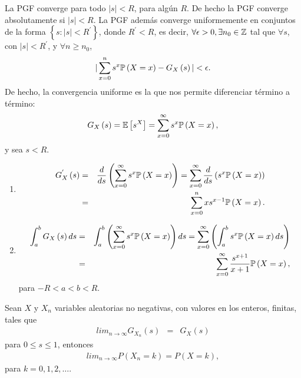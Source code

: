 \begin{Note}
La PGF converge para todo $|s|<R$, para alg\'un $R$. De hecho la
PGF converge absolutamente si $|s|<R$. La PGF adem\'as converge
uniformemente en conjuntos de la forma
$\left\{s:|s|<R^{'}\right\}$, donde $R^{'}<R$, es decir,
$\forall\epsilon>0, \exists n_{0}\in\mathbb{Z}$ tal que $\forall s$, con
$|s|<R^{'}$, y $\forall n\geq n_{0}$,
\begin{eqnarray*}
|\sum_{x=0}^{n}s^{x}\mathbb{P}\left(X=x\right)-G_{X}\left(s\right)|<\epsilon.
\end{eqnarray*}
De hecho, la convergencia uniforme es la que nos permite
diferenciar t\'ermino a t\'ermino:
\begin{eqnarray*}
G_{X}\left(s\right)=\mathbb{E}\left[s^{X}\right]=\sum_{x=0}^{\infty}s^{x}\mathbb{P}\left(X=x\right),
\end{eqnarray*}
y sea $s<R$.
\begin{enumerate}
\item
\begin{eqnarray*}
G_{X}^{'}\left(s\right)&=&\frac{d}{ds}\left(\sum_{x=0}^{\infty}s^{x}\mathbb{P}\left(X=x\right)\right)=\sum_{x=0}^{\infty}\frac{d}{ds}\left(s^{x}\mathbb{P}\left(X=x\right)\right)\\
&=&\sum_{x=0}^{n}xs^{x-1}\mathbb{P}\left(X=x\right).
\end{eqnarray*}

\item\begin{eqnarray*}
\int_{a}^{b}G_{X}\left(s\right)ds&=&\int_{a}^{b}\left(\sum_{x=0}^{\infty}s^{x}\mathbb{P}\left(X=x\right)\right)ds=\sum_{x=0}^{\infty}\left(\int_{a}^{b}s^{x}\mathbb{P}\left(X=x\right)ds\right)\\
&=&\sum_{x=0}^{\infty}\frac{s^{x+1}}{x+1}\mathbb{P}\left(X=x\right),
\end{eqnarray*}
para $-R<a<b<R$.
\end{enumerate}
\end{Note}

\begin{Teo}
Sean $X$ y $X_{n}$ variables aleatorias no negativas, con valores
en los enteros, finitas, tales que
\begin{eqnarray*}
lim_{n\rightarrow\infty}G_{X_{n}}\left(s\right)&=&G_{X}\left(s\right)
\end{eqnarray*}
para $0\leq s\leq1$, entonces
\begin{eqnarray*}
lim_{n\rightarrow\infty}P\left(X_{n}=k\right)=P\left(X=k\right),
\end{eqnarray*}
para $k=0,1,2,\ldots.$
\end{Teo}

